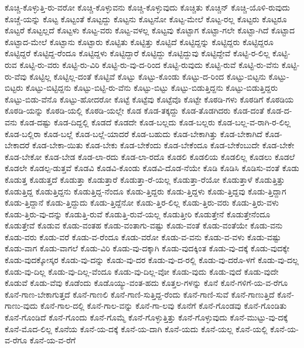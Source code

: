 {ಕೊಚ್ಚಿ-ಕೊಳ್ಳುತ್ತಿ-ರು-ವರೋ
ಕೊಚ್ಚಿ-ಕೊಳ್ಳುವನು
ಕೊಚ್ಚಿ-ಕೊಳ್ಳುವುದು
ಕೊಚ್ಚಿತು
ಕೊಚ್ಚಿನ್
ಕೊಚ್ಚಿ-ಯೊಳಿ-ರುವುದು
ಕೊಚ್ಚೆ-ಯನ್ನು
ಕೊಟ್ಟ
ಕೊಟ್ಟಂತೆ
ಕೊಟ್ಟದ್ದು
ಕೊಟ್ಟನು
ಕೊಟ್ಟನೋ
ಕೊಟ್ಟ-ಮೇಲೆ
ಕೊಟ್ಟ-ರಲ್ಲ
ಕೊಟ್ಟರು
ಕೊಟ್ಟರೂ
ಕೊಟ್ಟರೆ
ಕೊಟ್ಟಲ್ಲದೆ
ಕೊಟ್ಟಳು
ಕೊಟ್ಟ-ವರು
ಕೊಟ್ಟ-ವಳಲ್ಲ
ಕೊಟ್ಟವು
ಕೊಟ್ಟಾಗ
ಕೊಟ್ಟಾ-ಗಲೇ
ಕೊಟ್ಟಾ-ಗಿದೆ
ಕೊಟ್ಟಾದ
ಕೊಟ್ಟಾದ-ಮೇಲೆ
ಕೊಟ್ಟಾನು
ಕೊಟ್ಟಾರು
ಕೊಟ್ಟಿತು
ಕೊಟ್ಟಿತ್ತು
ಕೊಟ್ಟಿದೆ
ಕೊಟ್ಟಿದ್ದನ್ನು
ಕೊಟ್ಟಿದ್ದರು
ಕೊಟ್ಟಿದ್ದರೂ
ಕೊಟ್ಟಿದ್ದರೆ
ಕೊಟ್ಟಿದ್ದ-ರೆಂದೂ
ಕೊಟ್ಟಿದ್ದಳು
ಕೊಟ್ಟಿದ್ದಾರೆ
ಕೊಟ್ಟಿದ್ದು
ಕೊಟ್ಟಿದ್ದುವು
ಕೊಟ್ಟಿದ್ದೇವೆ
ಕೊಟ್ಟಿ-ರ-ಲಿಲ್ಲ
ಕೊಟ್ಟಿ-ರುವ
ಕೊಟ್ಟಿ-ರು-ವರು
ಕೊಟ್ಟಿ-ರು-ವಿರಿ
ಕೊಟ್ಟಿ-ರು-ವು-ದ-ರಿಂದ
ಕೊಟ್ಟಿ-ರುವುದು
ಕೊಟ್ಟಿ-ರುವೆ
ಕೊಟ್ಟಿ-ರು-ವೆನು
ಕೊಟ್ಟಿ-ರು-ವೆವು
ಕೊಟ್ಟಿಲ್ಲ
ಕೊಟ್ಟಿಲ್ಲ-ದಂತೆ
ಕೊಟ್ಟಿವೆ
ಕೊಟ್ಟು
ಕೊಟ್ಟು-ಕೊಂಡು
ಕೊಟ್ಟು-ದ-ರಿಂದ
ಕೊಟ್ಟು-ಬಿಟ್ಟನು
ಕೊಟ್ಟು-ಬಿಟ್ಟರು
ಕೊಟ್ಟು-ಬಿಟ್ಟಿದ್ದನು
ಕೊಟ್ಟು-ಬಿಟ್ಟಿ-ರು-ವೆನು
ಕೊಟ್ಟು-ಬಿಟ್ಟು
ಕೊಟ್ಟು-ಬಿಡುತ್ತಿದ್ದನು
ಕೊಟ್ಟು-ಬಿಡುತ್ತಿದ್ದರು
ಕೊಟ್ಟು-ಬಿಡು-ವೆನೊ
ಕೊಟ್ಟು-ಹೋದರೋ
ಕೊಟ್ಟೆ
ಕೊಟ್ಟೆವು
ಕೊಟ್ಟೆವೊ
ಕೊಟ್ಟೇ
ಕೊಠಡಿ-ಗಳು
ಕೊಠಡಿಗೆ
ಕೊಠಡಿಯ
ಕೊಠಡಿ-ಯನ್ನು
ಕೊಠಡಿ-ಯಲ್ಲಿ
ಕೊಠಡಿ-ಯಲ್ಲೇ
ಕೊಡ
ಕೊಡ-ತಕ್ಕದ್ದು
ಕೊಡ-ತೊಡಗಿದರು
ಕೊಡ-ದಂತೆ
ಕೊಡ-ದ-ವನು
ಕೊಡ-ದಷ್ಟು
ಕೊಡ-ದಿದ್ದಲ್ಲಿ
ಕೊಡದೆ
ಕೊಡದೇ
ಕೊಡ-ಬಲ್ಲದು
ಕೊಡ-ಬಲ್ಲರು
ಕೊಡ-ಬಲ್ಲ-ವ-ರಾಗಿ-ರ-ಲಿಲ್ಲ
ಕೊಡ-ಬಲ್ಲಿರಾ
ಕೊಡ-ಬಲ್ಲೆ
ಕೊಡ-ಬಲ್ಲೆ-ಯಾದರೆ
ಕೊಡ-ಬಹುದು
ಕೊಡ-ಬೇಕಾಗಿತ್ತು
ಕೊಡ-ಬೇಕಾಗಿದೆ
ಕೊಡ-ಬೇಕಾದರೆ
ಕೊಡ-ಬೇಕಾ-ಯಿತು
ಕೊಡ-ಬೇಕು
ಕೊಡ-ಬೇಕೆಂದು
ಕೊಡ-ಬೇಕೆಂದೂ
ಕೊಡ-ಬೇಕೆಂಬುದೇ
ಕೊಡ-ಬೇಕೇ
ಕೊಡ-ಬೇಕೋ
ಕೊಡ-ಬೇಡ
ಕೊಡ-ಲಾ-ರದು
ಕೊಡ-ಲಾ-ರದೊ
ಕೊಡಲಿ
ಕೊಡಲಿಯ
ಕೊಡಲಿಲ್ಲ
ಕೊಡಲು
ಕೊಡಲೆ
ಕೊಡಲೇ
ಕೊಡಲ್ಪ-ಡುತ್ತವೆ
ಕೊಡವಿ
ಕೊಡವಿ-ಕೊಂಡು
ಕೊಡವಿ-ದೊಡ-ನೆಯೇ
ಕೊಡಿ
ಕೊಡಿಸಿ
ಕೊಡಿಸು-ವಂತೆ
ಕೊಡು
ಕೊಡುತ್ತ
ಕೊಡುತ್ತದೆ
ಕೊಡುತ್ತಾ
ಕೊಡುತ್ತಾರೆ
ಕೊಡುತ್ತಾ-ರೆ-ಯಲ್ಲ
ಕೊಡುತ್ತಾ-ರೆಯೋ
ಕೊಡುತ್ತಾಳೆ
ಕೊಡುತ್ತಿತ್ತು
ಕೊಡುತ್ತಿದ್ದ
ಕೊಡುತ್ತಿದ್ದನು
ಕೊಡುತ್ತಿದ್ದ-ನೆಂದೂ
ಕೊಡು-ತ್ತಿದ್ದರು
ಕೊಡು-ತ್ತಿದ್ದಳು
ಕೊಡು-ತ್ತಿದ್ದವು
ಕೊಡು-ತ್ತಿದ್ದಾಗ
ಕೊಡು-ತ್ತಿದ್ದಾನೆ
ಕೊಡು-ತ್ತಿದ್ದುದು
ಕೊಡು-ತ್ತಿದ್ದೆನೋ
ಕೊಡು-ತ್ತಿರ-ಲಿಲ್ಲ
ಕೊಡು-ತ್ತಿರು-ವರು
ಕೊಡು-ತ್ತಿರು-ವಳು
ಕೊಡು-ತ್ತಿರು-ವು-ದನ್ನು
ಕೊಡುತ್ತಿ-ರುವೆ
ಕೊಡುತ್ತಿ-ರುವೆ-ಯಲ್ಲ
ಕೊಡುತ್ತೀರಿ
ಕೊಡುತ್ತೇನೆ
ಕೊಡುತ್ತೇನೆಂದೂ
ಕೊಡುತ್ತೇವೆ
ಕೊಡುವ
ಕೊಡು-ವಂತಹ
ಕೊಡು-ವಂತಾಗು-ವಷ್ಟು
ಕೊಡು-ವಂತೆ
ಕೊಡು-ವಂತೆಯೇ
ಕೊಡು-ವನು
ಕೊಡು-ವರು
ಕೊಡು-ವರೆ
ಕೊಡು-ವ-ರೆಂದೂ
ಕೊಡು-ವರೋ
ಕೊಡು-ವ-ವನು
ಕೊಡು-ವ-ವಳು
ಕೊಡು-ವಷ್ಟು
ಕೊಡು-ವಾಗ
ಕೊಡು-ವಾಗಲೆ
ಕೊಡು-ವಿರಿ
ಕೊಡು-ವು-ದಕ್ಕಾಗಿ
ಕೊಡು-ವುದಕ್ಕಿಂತ
ಕೊಡು-ವು-ದಕ್ಕೆ
ಕೊಡು-ವುದಕ್ಕೇ
ಕೊಡು-ವುದಕ್ಕೋಸ್ಕರ
ಕೊಡು-ವು-ದನ್ನು
ಕೊಡು-ವು-ದರ
ಕೊಡು-ವು-ದ-ರಲ್ಲಿ
ಕೊಡು-ವು-ದರೊ-ಳಗೆ
ಕೊಡು-ವು-ದಲ್ಲ
ಕೊಡು-ವು-ದಿಲ್ಲ
ಕೊಡು-ವು-ದಿಲ್ಲ-ವೆಂದೂ
ಕೊಡು-ವು-ದಿಲ್ಲ-ವೋ
ಕೊಡು-ವುದು
ಕೊಡು-ವುದೆ
ಕೊಡು-ವುದೇ
ಕೊಡುವೆ
ಕೊಡು-ವೆವು
ಕೊಡೆಂದು
ಕೊಡೊಯ್ಯು-ವಂತ-ಹದು
ಕೊತ್ತಲ-ಗಳನ್ನು
ಕೊನೆ
ಕೊನೆ-ಗಳಿಗೆ-ಯ-ವ-ರೆಗೂ
ಕೊನೆ-ಗಾಣ-ಬೇಕಾಗುತ್ತದೆ
ಕೊನೆ-ಗಾಣಲಿ
ಕೊನೆ-ಗಾಣಿ-ಸುತ್ತಿದ್ದ-ರೆಂದು
ಕೊನೆ-ಗಾಣಿ-ಸುವೆ
ಕೊನೆ-ಗಾಣುತ್ತಿದೆ
ಕೊನೆ-ಗಾಣು-ವುದು
ಕೊನೆ-ಗಾಲ-ದಲ್ಲಿ
ಕೊನೆ-ಗಾಲ-ವನ್ನು
ಕೊನೆ-ಗಾ-ಲವು
ಕೊನೆಗೆ
ಕೊನೆ-ಗೊಂಡವು
ಕೊನೆ-ಗೊಂಡಿತು
ಕೊನೆ-ಗೊಂಡಿದೆ
ಕೊನೆ-ಗೊಂದು
ಕೊನೆ-ಗೊಮ್ಮೆ
ಕೊನೆ-ಗೊಳ್ಳುತ್ತಿತ್ತು
ಕೊನೆ-ಗೊಳ್ಳುವುದು
ಕೊನೆ-ಮುಟ್ಟು-ವು-ದಕ್ಕೆ
ಕೊನೆ-ಮೊದ-ಲಿಲ್ಲ
ಕೊನೆಯ
ಕೊನೆ-ಯ-ದಕ್ಕೆ
ಕೊನೆ-ಯ-ದಾಗಿ
ಕೊನೆ-ಯದು
ಕೊನೆ-ಯಲ್ಲ
ಕೊನೆ-ಯಲ್ಲಿ
ಕೊನೆ-ಯ-ವ-ರೆಗೂ
ಕೊನೆ-ಯ-ವ-ರೆಗೆ
}
